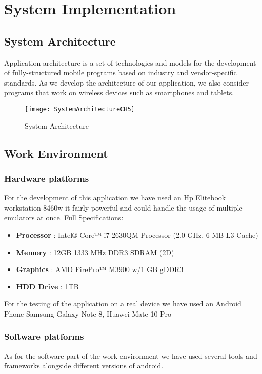 \chapter{System Implementation} \label{chap:sysImplementation}

\section{System Architecture}
Application architecture is a set of technologies and models for the development of 
fully-structured mobile programs based on industry and vendor-specific standards. As we develop the architecture of our application, we also consider programs that work on wireless devices such as smartphones and tablets.

\begin{figure}[ht]
\center
\texttt{[image: SystemArchitectureCH5]}
\caption{System Architecture}
\label{fig:System Architecture}
\end{figure}

\section{Work Environment}

\subsection{Hardware platforms}
For the development of this application we have used an Hp Elitebook workstation 8460w it fairly powerful and could handle the usage of multiple emulators at once. Full Specifications:

\begin{itemize}
\item \textbf{Processor} : Intel® Core™ i7-2630QM Processor (2.0 GHz, 6 MB L3 Cache)
\item \textbf{Memory }: 12GB 1333 MHz DDR3 SDRAM (2D)
\item \textbf{Graphics }: AMD FirePro™ M3900 w/1 GB gDDR3
\item \textbf{HDD Drive }: 1TB
\end{itemize}

For the testing of the application on a real device we have used an Android Phone Samsung Galaxy Note 8, Huawei  Mate 10 Pro

\subsection{Software platforms}
As for the software part of the work environment we have used several tools 
and frameworks alongside different versions of android.

